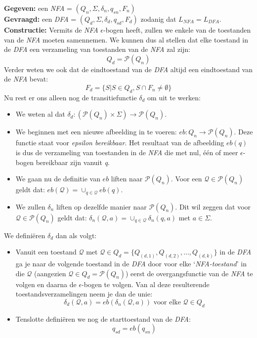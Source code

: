 \textbf{Gegeven:} een \emph{NFA} = $(Q_n, \Sigma, \delta_n, q_{sn}, F_n)$ \\
\textbf{Gevraagd:} een \emph{DFA} = $(Q_d, \Sigma, \delta_d, q_{sd}, F_d)$ zodanig dat $L_{NFA}=L_{DFA}$.\\
\textbf{Constructie:} Vermits de \emph{NFA} $\epsilon$-bogen heeft, zullen we enkele van de toestanden van de \emph{NFA} moeten samennemen. We kunnen dus al stellen dat elke toestand in de \emph{DFA} een verzameling van toestanden van de \emph{NFA} zal zijn:
$$ Q_d =  \mathcal{P}(Q_n)$$
Verder weten we ook dat de eindtoestand van de \emph{DFA} altijd een eindtoestand van de \emph{NFA} bevat:
$$ F_d = \{S | S \in Q_d, S \cap F_n \neq \emptyset \}  $$
Nu rest er ons alleen nog de transitiefunctie $\delta_d$ om uit te werken:
\begin{itemize}
\item We weten al dat $\delta_d : (\mathcal{P} (Q_n) \times \Sigma) \rightarrow \mathcal{P}(Q_n)$.
\item We beginnen met een nieuwe afbeelding in te voeren: $eb: Q_n \rightarrow \mathcal{P}(Q_n)$. Deze functie staat voor \emph{epsilon bereikbaar}. Het resultaat van de afbeelding $eb(q)$ is dus de verzameling van toestanden in de \emph{NFA} die met nul, \'e\'en of meer $\epsilon$-bogen bereikbaar zijn vanuit \emph{q}.
\item We gaan nu de definitie van $eb$ liften naar $\mathcal{P}(Q_n)$. Voor een $\mathcal{Q} \in \mathcal{P}(Q_n)$ geldt dat: $eb(\mathcal{Q}) = \cup_{q \in \mathcal{Q}} eb(q)$.
\item We zullen $\delta_n$ liften op dezelfde manier naar $\mathcal{P}(Q_n)$. Dit wil zeggen dat voor $\mathcal{Q} \in \mathcal{P}(Q_n)$ geldt dat: $\delta_n(\mathcal{Q},a) = \cup_{q \in \mathcal{Q}}\delta_n(q,a)$ met $a \in \Sigma$.
\end{itemize}
We defini\"eren $\delta_d$ dan als volgt:
\begin{itemize}
\item Vanuit een toestand $\mathcal{Q}$ met $\mathcal{Q} \in Q_d = \{Q_{(d,1)}, Q_{(d,2)}, \dots, Q_{(d,k)}\}$  in de \emph{DFA} ga je naar de volgende toestand in de \emph{DFA} door voor elke `\emph{NFA-toestand}' in die $\mathcal{Q}$ (aangezien $\mathcal{Q} \in Q_d = \mathcal{P}(Q_n)$) eerst de overgangsfunctie van de \emph{NFA} te volgen en daarna de $\epsilon$-bogen te volgen. Van al deze resulterende toestandsverzamelingen neem je dan de unie:
$$ \delta_d(\mathcal{Q},a) = eb(\delta_n(\mathcal{Q},a)) \text{ voor elke } \mathcal{Q} \in Q_d $$
\item Tenslotte defini\"eren we nog de starttoestand van de \emph{DFA}:
$$ q_{sd} = eb(q_{sn}) $$
\end{itemize}

